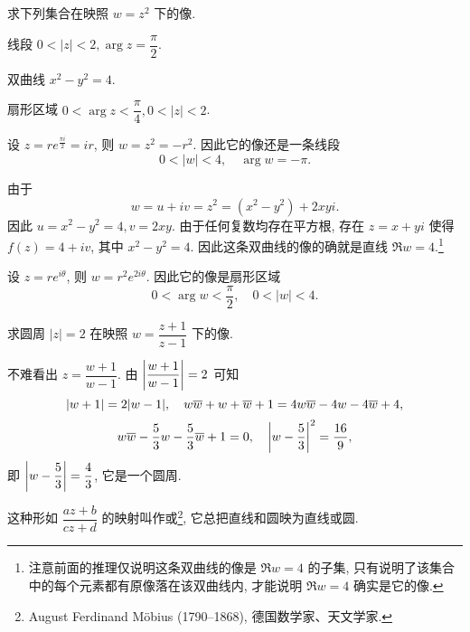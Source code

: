 \begin{example}
  求下列集合在映照 $w=z^2$ 下的像.
  \begin{enumpar}[(i)]
    \item 线段 $0<|z|<2,\arg z=\dfrac\pi2$.
    \item 双曲线 $x^2-y^2=4$.
    \item 扇形区域 $0<\arg z<\dfrac\pi4,0<|z|<2$.
  \end{enumpar}
\end{example}
\begin{solution}\delspace
  \begin{enumnopar}[(i)]
    \item 设 $z=re^{\frac{\pi i}2}=ir$, 则 $w=z^2=-r^2$.
      因此它的像还是一条线段
      \[
        0<|w|<4,\quad\arg w=-\pi.
      \]
    \item 由于
      \[
        w=u+iv=z^2=(x^2-y^2)+2xyi.
      \]
      因此 $u=x^2-y^2=4,v=2xy$.
      由于任何复数均存在平方根, 存在 $z=x+yi$ 使得 $f(z)=4+iv$, 其中 $x^2-y^2=4$.
      因此这条双曲线的像的确就是直线 $\Re w=4$.\footnote{注意前面的推理仅说明这条双曲线的像是 $\Re w=4$ 的子集, 只有说明了该集合中的每个元素都有原像落在该双曲线内, 才能说明 $\Re w=4$ 确实是它的像.}
    \item 设 $z=re^{i\theta}$, 则 $w=r^2e^{2i\theta}$.
      因此它的像是扇形区域
      \[
        0<\arg w<\dfrac\pi2,\quad 0<|w|<4.
      \]
  \end{enumnopar}
\end{solution}

\begin{example}
  求圆周 $|z|=2$ 在映照 $w=\dfrac{z+1}{z-1}$ 下的像.
\end{example}

\begin{solution}
  不难看出 $z=\dfrac{w+1}{w-1}$.
  由 $\left|\dfrac{w+1}{w-1}\right|=2$ 可知
  \[
    |w+1|=2|w-1|,\quad w\overline w+w+\overline w+1=4w\overline w-4w-4\overline w+4,
  \]
  \[
    w\overline w-\frac53 w-\frac53\overline w+1=0,\quad \left|w-\frac53\right|^2=\frac{16}9,
  \]
  即 $\left|w-\dfrac53\right|=\dfrac43$, 它是一个圆周.
\end{solution}

这种形如 $\dfrac{az+b}{cz+d}$ 的映射叫作或\footnote{
  August Ferdinand M\"obius (1790--1868), 德国数学家、天文学家.
}, 它总把直线和圆映为直线或圆.



